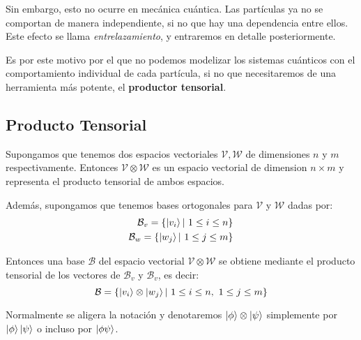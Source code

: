 Sin embargo, esto no ocurre en mecánica cuántica. Las partículas ya no se comportan de manera independiente, si no que hay una dependencia entre ellos. Este efecto se llama \textit{entrelazamiento}, y entraremos en detalle posteriormente. 

Es por este motivo por el que no podemos modelizar los sistemas cuánticos con el comportamiento individual de cada partícula, si no que necesitaremos de una herramienta más potente, el \textbf{productor tensorial}.

\subsection{Producto Tensorial}

Supongamos que tenemos dos espacios vectoriales $\mathcal{V},\mathcal{W}$ de dimensiones $n$ y $m$ respectivamente. Entonces $\mathcal{V}\otimes\mathcal{W}$ es un espacio vectorial de dimension $n\times m$ y representa el producto tensorial de ambos espacios.

Además, supongamos que tenemos bases ortogonales para $\mathcal{V}$ y $\mathcal{W}$ dadas por:
\begin{equation}
\begin{split}
\mathcal{B}_v =\{\left|v_i\right\rangle |\ 1 \leq i \leq n \} \\
\mathcal{B}_w =\{\left|w_j\right\rangle |\ 1 \leq j \leq m \}
\end{split}
\end{equation}

Entonces una base $\mathcal{B}$ del espacio vectorial $\mathcal{V}\otimes\mathcal{W}$ se obtiene mediante el producto tensorial de los vectores de $\mathcal{B}_v$  y $\mathcal{B}_v$, es decir:
\begin{equation}
\mathcal{B} = \{\left|v_i\right\rangle\otimes\left|w_j\right\rangle|\ 1 \leq i \leq n,\ 1 \leq j \leq m \}
\end{equation}

Normalmente se aligera la notación y denotaremos $\left|\phi\right\rangle\otimes\left|\psi\right\rangle$ simplemente por $\left|\phi\right\rangle\left|\psi\right\rangle$ o incluso por $\left|\phi\psi\right\rangle$.

